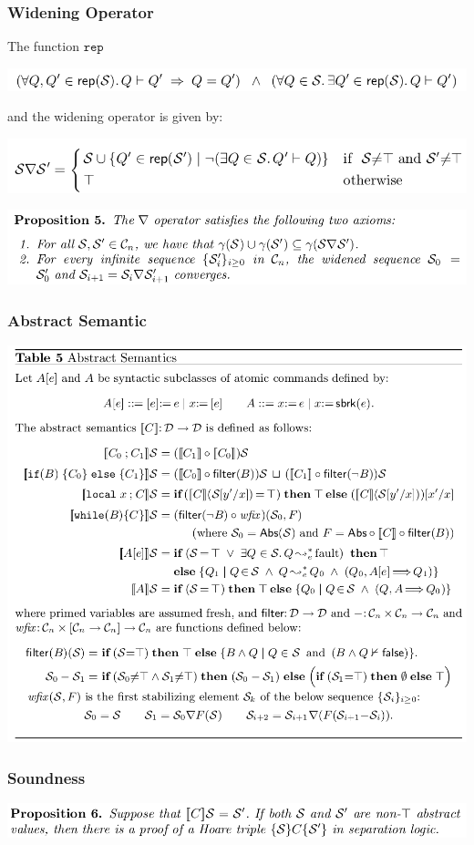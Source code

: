 \documentclass[aspectratio=1610, 13pt]{beamer}
\begin{document}
\begin{frame}\frametitle{Widening Operator}
The function $\mathtt{rep}$
\begin{center}
\includegraphics[scale=0.4]{rep.png}

\end{center}

and the widening operator is given by:

\begin{center}
\includegraphics[scale=0.4]{widen.png}

\includegraphics[scale=0.4]{axiom.png}
\end{center}

\end{frame}

\begin{frame}\frametitle{Abstract Semantic}

\begin{center}
\includegraphics[scale=0.32]{table5.png}
\end{center}
\end{frame}

\begin{frame}\frametitle{Soundness}
\begin{center}
\includegraphics[scale=0.4]{sound.png}
\end{center}
\end{frame}
\end{document}
